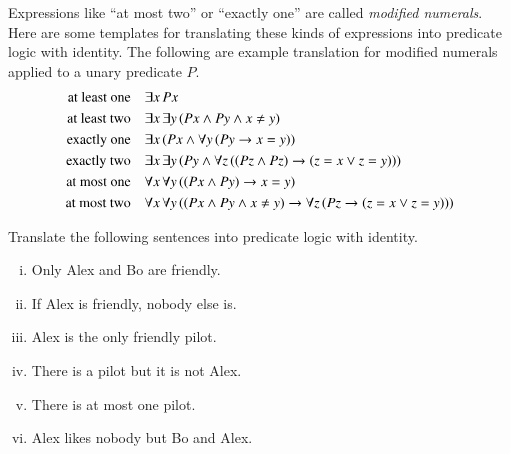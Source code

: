 \documentclass[nobib,nofonts]{tufte-handout}
\begin{document}
Expressions like ``at most two'' or ``exactly one'' are called \emph{modified numerals}.
Here are some templates for translating these kinds of expressions into predicate logic with identity.
The following are example translation for modified numerals applied to a unary predicate $P$.
\begin{align*}
  \text{at least one} &&& \exists x \thinspace Px \\
  \text{at least two} &&& \exists x \thinspace  \exists y \thinspace (Px \wedge Py \wedge x \neq y) \\
  \text{exactly one}  &&& \exists x \thinspace (Px \wedge \forall y \thinspace (Py \rightarrow x = y) )\\
  \text{exactly two}  &&& \exists x \thinspace \exists y \thinspace (Py \wedge \forall z \thinspace ((Pz \wedge Pz) \rightarrow (z = x \vee z = y))) \\
  \text{at most one}  &&& \forall x \thinspace \forall y \thinspace ((Px \wedge Py) \rightarrow x = y) \\
  \text{at most two}  &&& \forall x \thinspace \forall y \thinspace ((Px \wedge Py \wedge x \neq y) \rightarrow \forall z \thinspace (Pz \rightarrow (z =x \vee z = y)) )
\end{align*}


\bigskip
\noindent \colorbox{mygray}{\centering
  \begin{minipage}{1.0\textwidth}

    \begin{exercise}
      Translate the following sentences into predicate logic with identity.
      \begin{enumerate}[(i)]
        \item Only Alex and Bo are friendly.
        \item If Alex is friendly, nobody else is.
        \item Alex is the only friendly pilot.
        \item There is a pilot but it is not Alex.
        \item There is at most one pilot.
        \item Alex likes nobody but Bo and Alex.
      \end{enumerate}
    \end{exercise}

  \end{minipage}
}
\end{document}
